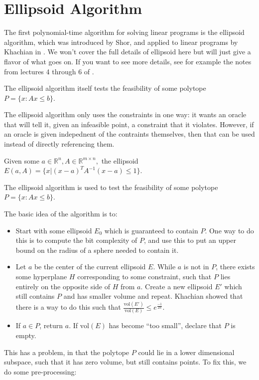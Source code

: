 \documentclass[11pt]{article}
\newcommand{\R}{\mathbb{R}}
\begin{document}
\section{Ellipsoid Algorithm}

The first polynomial-time algorithm for solving linear programs is
the ellipsoid algorithm, which was introduced by Shor, and applied
to linear programs by Khachian in \cite{Khachian79}. We won't cover the full details of ellipsoid here but will just
give a flavor of what goes on. If you want to see more details, see for example the notes from lectures 4 through 6 of \cite{Goemans01}.

The ellipsoid algorithm itself tests the feasibility of some polytope
$P=\{x:Ax\le b\}$.

The ellipsoid algorithm only uses the constraints in one way: it wants
an oracle that will tell it, given an infeasible point, a constraint
that it violates. However, if an oracle is given indepednent of the
contraints themselves, then that can be used instead of directly referencing
them.

Given some $a\in\R^n,A\in\R^{m\times n},$ the ellipsoid $E(a,A)=\{x|(x-a)^{T}A^{-1}(x-a)\leq1\}$.

The ellipsoid algorithm is used to test the feasibility of some polytope
$P=\{x:Ax\leq b\}$.

The basic idea of the algorithm is to: 
\begin{itemize}
\item Start with some ellipsoid $E_{0}$ which is guaranteed to contain
$P$. One way to do this is to compute the bit complexity of $P$,
and use this to put an upper bound on the radius of a sphere needed
to contain it.
\item Let $a$ be the center of the current ellipsoid $E$. While $a$ is
not in $P$, there exists some hyperplane $H$ corresponding to some
constraint, such that $P$ lies entirely on the opposite side of $H$
from $a$. Create a new ellipsoid $E'$ which still contains $P$
and has smaller volume and repeat. Khachian showed that there is a
way to do this such that $\frac{\mbox{vol}(E')}{\mbox{vol}(E)}\le e^{\frac{-1}{2n}}$.
\item If $a\in P$, return $a$. If $\mbox{vol}(E)$ has become ``too small'',
declare that $P$ is empty.
\end{itemize}
This has a problem, in that the polytope $P$ could lie in a lower
dimensional subspace, such that it has zero volume, but still contains
points. To fix this, we do some pre-processing:
\end{document}
